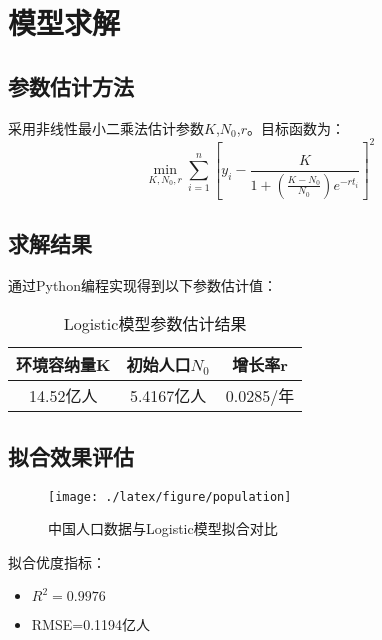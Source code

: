 \section{模型求解}

\subsection{参数估计方法}
采用非线性最小二乘法估计参数$K$,$N_0$,$r$。目标函数为：
\begin{equation}
\min_{K,N_0,r}\sum_{i=1}^{n}\left[y_i-\frac{K}{1+\left(\frac{K-N_0}{N_0}\right)e^{-rt_i}}\right]^2
\end{equation}

\subsection{求解结果}
通过Python编程实现得到以下参数估计值：
\begin{table}[htbp]
\centering
\caption{Logistic模型参数估计结果}
\begin{tabular}{ccc}
\toprule
\textbf{环境容纳量K} & \textbf{初始人口$N_0$} & \textbf{增长率r} \\
\midrule
14.52亿人 &5.4167亿人 &0.0285/年 \\
\bottomrule
\end{tabular}
\end{table}

\subsection{拟合效果评估}
\begin{figure}[htbp]
\centering
\texttt{[image: ./latex/figure/population]}
\caption{中国人口数据与Logistic模型拟合对比}
\end{figure}

拟合优度指标：
\begin{itemize}
\item $R^2=0.9976$
\item RMSE=0.1194亿人
\end{itemize}
